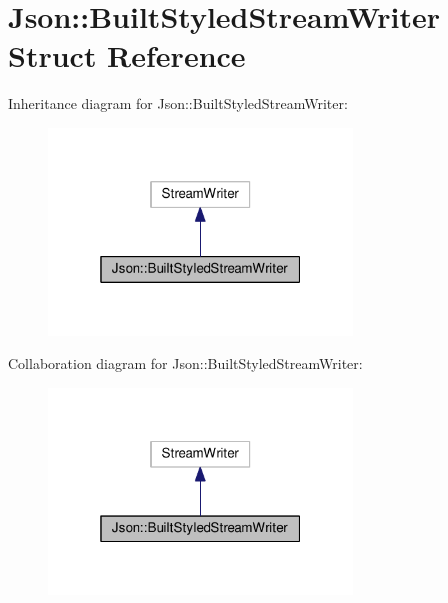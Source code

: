 \hypertarget{struct_json_1_1_built_styled_stream_writer}{}\section{Json\+:\+:Built\+Styled\+Stream\+Writer Struct Reference}
\label{struct_json_1_1_built_styled_stream_writer}


Inheritance diagram for Json\+:\+:Built\+Styled\+Stream\+Writer\+:\nopagebreak
\begin{figure}[H]
\begin{center}
\leavevmode
\includegraphics[width=229pt]{struct_json_1_1_built_styled_stream_writer__inherit__graph}
\end{center}
\end{figure}


Collaboration diagram for Json\+:\+:Built\+Styled\+Stream\+Writer\+:\nopagebreak
\begin{figure}[H]
\begin{center}
\leavevmode
\includegraphics[width=229pt]{struct_json_1_1_built_styled_stream_writer__coll__graph}
\end{center}
\end{figure}

